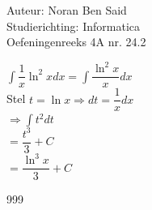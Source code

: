 \documentclass[a4paper]{article}
\begin{document}
  
\noindent \large Auteur: Noran Ben Said \\
\noindent \large Studierichting: Informatica\\
\noindent \large Oefeningenreeks 4A nr. 24.2\\

\medskip

\normalsize

$ \displaystyle\int \dfrac{1}{x} \ln^2 x dx = \displaystyle\int \dfrac{\ln^2 x}{x} dx $ \\

Stel $t = \ln x \Rightarrow dt = \dfrac{1}{x} dx$\\

$ \Rightarrow \displaystyle\int t^2 dt $ \\

$ = \dfrac{t^3}{3} + C $ \\

$ = \dfrac{\ln^3 x}{3} + C $ \\


\begin{thebibliography}{999}
\end{thebibliography}
\end{document}
